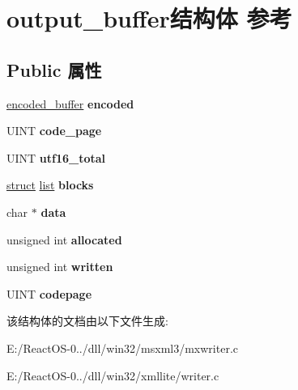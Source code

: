 \hypertarget{structoutput__buffer}{}\section{output\+\_\+buffer结构体 参考}
\label{structoutput__buffer}
\subsection*{Public 属性}
\begin{DoxyCompactItemize}
\item 
\mbox{\label{structoutput__buffer_abfb021889d2bfeecec378cd436e39dd9}} 
\hyperlink{structencoded__buffer}{encoded\+\_\+buffer} {\bfseries encoded}
\item 
\mbox{\label{structoutput__buffer_a5a5c675d1dcd48042dae80935a368d4d}} 
U\+I\+NT {\bfseries code\+\_\+page}
\item 
\mbox{\label{structoutput__buffer_a5393c8a74dca931bde7a27977a91e2f7}} 
U\+I\+NT {\bfseries utf16\+\_\+total}
\item 
\mbox{\label{structoutput__buffer_a9718932f7af33d96998150716c1f0f9e}} 
\hyperlink{interfacestruct}{struct} \hyperlink{classlist}{list} {\bfseries blocks}
\item 
\mbox{\label{structoutput__buffer_a714bd0ba7390b871750e28b8f72be2ae}} 
char $\ast$ {\bfseries data}
\item 
\mbox{\label{structoutput__buffer_ad6ce05bd41c4bc3333d92f8e8e326f5b}} 
unsigned int {\bfseries allocated}
\item 
\mbox{\label{structoutput__buffer_ab57c5920fef21fdb28bf066fefd91f1d}} 
unsigned int {\bfseries written}
\item 
\mbox{\label{structoutput__buffer_a9154b55fcdb0ca0e8da4c78e08ac4caf}} 
U\+I\+NT {\bfseries codepage}
\end{DoxyCompactItemize}


该结构体的文档由以下文件生成\+:\begin{DoxyCompactItemize}
\item 
E\+:/\+React\+O\+S-\/0../dll/win32/msxml3/mxwriter.\+c\item 
E\+:/\+React\+O\+S-\/0../dll/win32/xmllite/writer.\+c\end{DoxyCompactItemize}
